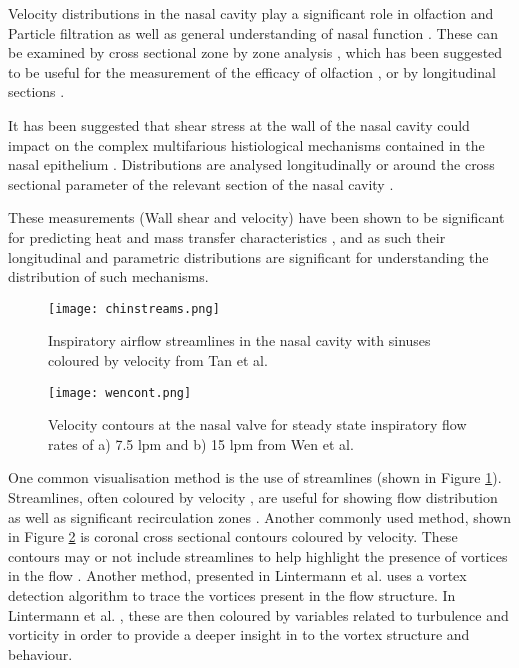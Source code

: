 Velocity distributions in the nasal cavity play a significant role in olfaction \cite{Ishikawa2009} and Particle filtration \cite{Inthavong2006, Wang2009a} as well as general understanding of nasal function \cite{Keyhani1995, Zhu2011, Lintermann2013}. 
These can be examined by cross sectional zone by zone analysis \cite{Keyhani1995, Zhu2011}, which has been suggested to be useful for the measurement of the efficacy of olfaction \cite{Zhu2011}, or by longitudinal sections \cite{Lintermann2013,Taylor2010}. 

It has been suggested that shear stress at the wall of the nasal cavity could impact on the complex multifarious histiological mechanisms contained in the nasal epithelium \cite{Elad2006}.
Distributions are analysed longitudinally \cite{Wen2008} or around the cross sectional parameter of the relevant section of the nasal cavity \cite{Burgos2014}. 

These measurements (Wall shear and velocity) have been shown to be significant for predicting heat and mass transfer characteristics \cite{Taylor2010}, and as such their longitudinal and parametric distributions are significant for understanding the distribution of such mechanisms. 

\begin{figure}
  \centering
  \texttt{[image: chinstreams.png]}
  \caption{Inspiratory airflow streamlines in the nasal cavity with sinuses coloured by velocity from Tan et al. \cite{Tan2012}} \label{fig:chinstreams}
\centering
\end{figure}

\begin{figure}
  \centering
  \texttt{[image: wencont.png]}
  \caption{Velocity contours at the nasal valve for steady state inspiratory flow rates of a) 7.5 lpm and b) 15 lpm from Wen et al. \cite{Wen2008}} \label{fig:wencont}
\centering
\end{figure}

One common visualisation method is the use of streamlines (shown in Figure \ref{fig:chinstreams}). Streamlines, often coloured by velocity \cite{Wen2008, Zhu2011, Garcia2007}, are useful for showing flow distribution as well as significant recirculation zones \cite{Lintermann2013, Xi2014}. Another commonly used method, shown in Figure \ref{fig:wencont} is coronal cross sectional contours coloured by velocity. These contours may or not include streamlines to help highlight the presence of vortices in the flow \cite{Wen2008}. Another method, presented in Lintermann et al. \cite{Lintermann2013} uses a vortex detection algorithm to trace the vortices present in the flow structure. In Lintermann et al. \cite{Lintermann2013}, these are then coloured by variables related to turbulence and vorticity in order to provide a deeper insight in to the vortex structure and behaviour.

